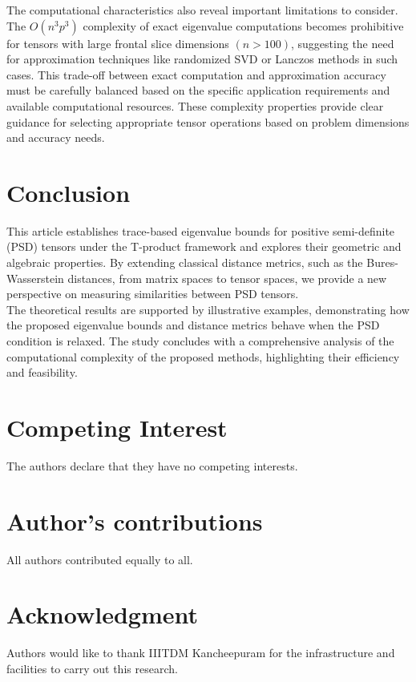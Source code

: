 \documentclass[oupthm]{CUP-JNL-BCM}%
\theoremstyle{oupplain}
\theoremstyle{oupdefinition}
\theoremstyle{oupremark}
\theoremstyle{oupproof}
\numberwithin{equation}{section}
\begin{document}
The computational characteristics also reveal important limitations to consider. The $O(n^3p^3)$ complexity of exact eigenvalue computations becomes prohibitive for tensors with large frontal slice dimensions $(n>100)$, suggesting the need for approximation techniques like randomized SVD or Lanczos methods in such cases. This trade-off between exact computation and approximation accuracy must be carefully balanced based on the specific application requirements and available computational resources. These complexity properties provide clear guidance for selecting appropriate tensor operations based on problem dimensions and accuracy needs.


\section{Conclusion}\label{conclusion}

This article establishes trace-based eigenvalue bounds for positive semi-definite (PSD) tensors under the T-product framework and explores their geometric and algebraic properties. By extending classical distance metrics, such as the Bures-Wasserstein distances, from matrix spaces to tensor spaces, we provide a new perspective on measuring similarities between PSD tensors. \\

\noindent The theoretical results are supported by illustrative examples, demonstrating how the proposed eigenvalue bounds and distance metrics behave when the PSD condition is relaxed. The study concludes with a comprehensive analysis of the computational complexity of the proposed methods, highlighting their efficiency and feasibility.


\section*{Competing Interest}
The authors declare that they have no competing interests.

\section*{Author's contributions}
All authors contributed equally to all.


\section*{Acknowledgment}
Authors would like to thank IIITDM Kancheepuram for the infrastructure and facilities
to carry out this research.
\end{document}
